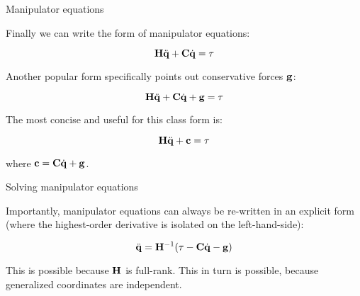 \documentclass{beamer}
\begin{document}
\begin{frame}{Manipulator equations}
	\begin{flushleft}
		
		Finally we can write the form of manipulator equations:
		
		\begin{equation}
			\mathbf{H} \ddot{\mathbf{q}} + \mathbf{C} \dot{\mathbf{q}} = \tau
		\end{equation}
		
		Another popular form specifically points out conservative forces $\mathbf{g}$:
		
		\begin{equation}
			\mathbf{H} \ddot{\mathbf{q}} + \mathbf{C} \dot{\mathbf{q}} + \mathbf{g} = \tau
		\end{equation}
		
		The most concise and useful for this class form is:
		
		\begin{equation}
			\mathbf{H} \ddot{\mathbf{q}} + \mathbf{c} = \tau
		\end{equation}
		
		where $\mathbf{c} = \mathbf{C} \dot{\mathbf{q}} + \mathbf{g}$.
		
	\end{flushleft}
\end{frame}




\begin{frame}{Solving manipulator equations}
	\begin{flushleft}
		
		Importantly, manipulator equations can always be re-written in an explicit form (where the highest-order derivative is isolated on the left-hand-side):
		
		\begin{equation}
			 \ddot{\mathbf{q}} = \mathbf{H}^{-1} (\tau - \mathbf{C} \dot{\mathbf{q}} - \mathbf{g} )
		\end{equation}
	
		This is possible because $\mathbf{H}$ is full-rank. This in turn is possible, because generalized coordinates are independent.
		
	\end{flushleft}
\end{frame}
\end{document}
